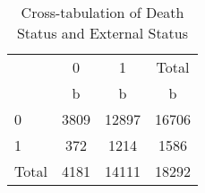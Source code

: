 \begin{table}[htbp]\centering
\def\sym#1{\ifmmode^{#1}\else\(^{#1}\)\fi}
\caption{Cross-tabulation of Death Status and External Status}
\begin{tabular}{l*{3}{c}}
\hline\hline
            &           0&           1&       Total\\
            &           b&           b&           b\\
\hline
0           &        3809&       12897&       16706\\
1           &         372&        1214&        1586\\
Total       &        4181&       14111&       18292\\
\hline\hline
\end{tabular}
\end{table}
